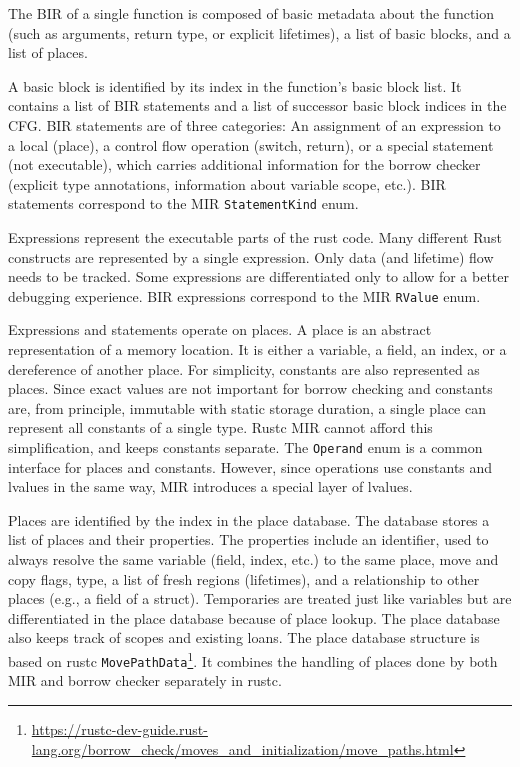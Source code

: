 \documentclass[
  11pt,
  twoside,symmetric]{report}
\DeclareRobustCommand{\href}[2]{#2\footnote{\url{#1}}}
\begin{document}
The BIR of a single function is composed of basic metadata about the
function (such as arguments, return type, or explicit lifetimes), a list
of basic blocks, and a list of places.

A basic block is identified by its index in the function's basic block
list. It contains a list of BIR statements and a list of successor basic
block indices in the CFG. BIR statements are of three categories: An
assignment of an expression to a local (place), a control flow operation
(switch, return), or a special statement (not executable), which carries
additional information for the borrow checker (explicit type
annotations, information about variable scope, etc.). BIR statements
correspond to the MIR \texttt{StatementKind} enum.

Expressions represent the executable parts of the rust code. Many
different Rust constructs are represented by a single expression. Only
data (and lifetime) flow needs to be tracked. Some expressions are
differentiated only to allow for a better debugging experience. BIR
expressions correspond to the MIR \texttt{RValue} enum.

Expressions and statements operate on places. A place is an abstract
representation of a memory location. It is either a variable, a field,
an index, or a dereference of another place. For simplicity, constants
are also represented as places. Since exact values are not important for
borrow checking and constants are, from principle, immutable with static
storage duration, a single place can represent all constants of a single
type. Rustc MIR cannot afford this simplification, and keeps constants
separate. The \texttt{Operand} enum is a common interface for places and
constants. However, since operations use constants and lvalues in the
same way, MIR introduces a special layer of lvalues.

Places are identified by the index in the place database. The database
stores a list of places and their properties. The properties include an
identifier, used to always resolve the same variable (field, index,
etc.) to the same place, move and copy flags, type, a list of fresh
regions (lifetimes), and a relationship to other places (e.g., a field
of a struct). Temporaries are treated just like variables but are
differentiated in the place database because of place lookup. The place
database also keeps track of scopes and existing loans. The place
database structure is based on rustc
\href{https://rustc-dev-guide.rust-lang.org/borrow_check/moves_and_initialization/move_paths.html}{\texttt{MovePathData}}.
It combines the handling of places done by both MIR and borrow checker
separately in rustc.
\end{document}
